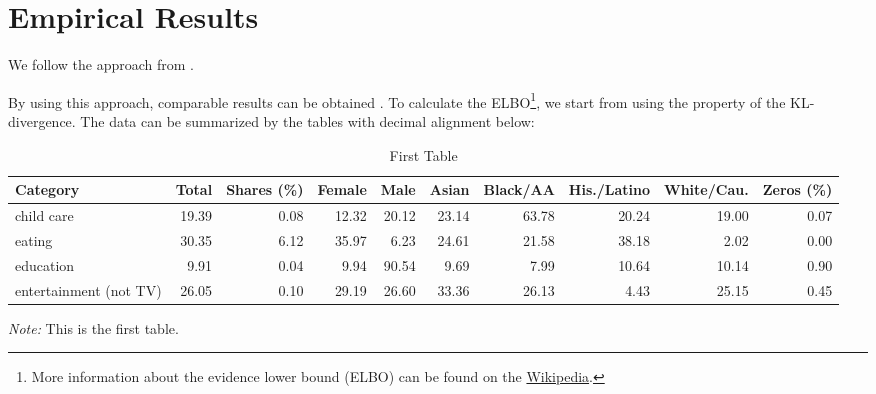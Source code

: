 \documentclass[11pt, letterpaper]{article}
\begin{document}
\lipsum[104] 

\section{Empirical Results}
We follow the approach from \cite{HL2019}. \lipsum[50] 

By using this approach, comparable results can be obtained \citep{CES2013}. To calculate the ELBO\footnote{More information about the evidence lower bound (ELBO) can be found on the \href{https://en.wikipedia.org/wiki/Evidence_lower_bound}{Wikipedia}. }, we start from using the property of the KL-divergence. The data can be summarized by the tables with decimal alignment below:

\renewcommand*\arraystretch{0.97}
\renewcommand{\tabcolsep}{2.5pt}
\begin{table}[H]
  \renewcommand{\thetable}{B.\arabic{table}a}
  \caption{First Table}
  \label{summary_a}
  \fontsize{10}{11}\selectfont
  \hspace*{-0.5cm}
  \begin{tabular}{lrrrrrrrrr}
    \toprule
    Category                   & Total & Shares (\%) & Female & Male  & Asian & Black/AA & His./Latino & White/Cau. & Zeros (\%) \\ \hline
    child care                 & 19.39 & 0.08   & 12.32  & 20.12 & 23.14 & 63.78    & 20.24       & 19.00      & 0.07  \\
    eating                     & 30.35 & 6.12   & 35.97  & 6.23 & 24.61 & 21.58    & 38.18       & 2.02      & 0.00  \\
    education                  & 9.91  & 0.04   & 9.94   & 90.54  & 9.69  & 7.99     & 10.64        & 10.14      & 0.90  \\
    entertainment (not TV)     & 26.05 & 0.10   & 29.19  & 26.60 & 33.36 & 26.13    & 4.43       & 25.15      & 0.45  \\ \bottomrule
  \end{tabular}
  \hspace*{-1cm}
  \begin{minipage}{1\textwidth}
    \onehalfspacing
    \vspace*{0.05cm}
    \begin{tablenotes}
      \footnotesize
      \item\textit{Note:} This is the first table.
    \end{tablenotes}
  \end{minipage}
\end{table}
\end{document}

